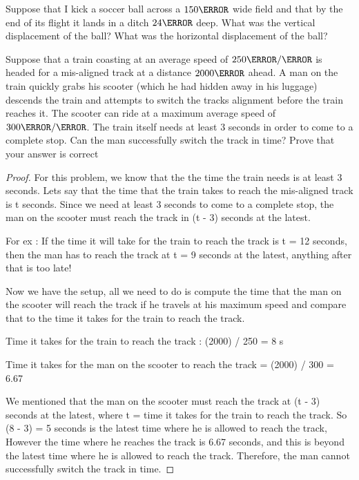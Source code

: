 \documentclass[12pt]{article} %
\begin{document}
\begin{qstn}[11]
Suppose that I kick a soccer ball across a $150\m$ wide field and that by the end of its flight it lands in a ditch $24\m$ deep. What was the vertical displacement of the ball? What was the horizontal displacement of the ball? 

\end{qstn}

\begin{qstn}[12]
Suppose that a train coasting at an average speed of $250 \m / \s$ is headed for a mis-aligned track at a distance $2000\m$ ahead. A man on the train quickly grabs his scooter (which he had hidden away in his luggage) descends the train and attempts to switch the tracks alignment before the train reaches it. The scooter can ride at a maximum average speed of $300 \m / \s$. The train itself needs at least $3$ seconds in order to come to a complete stop. Can the man successfully switch the track in time? Prove that your answer is correct

\begin{soln}
\begin{proof}
	For this problem, we know that the the time the train needs is at least 3 seconds. Lets say that the time that the train takes to reach the mis-aligned track is t seconds. Since we need at least 3 seconds to come to a complete stop, the man on the scooter must reach the track in (t - 3) seconds at the latest.

	For ex : If the time it will take for the train to reach the track is t = 12 seconds, then the man has to reach the track at t = 9 seconds at the latest, anything after that is too late!
	
	Now we have the setup, all we need to do is compute the time that the man on the scooter will reach the track if he travels at his maximum speed and compare that to the time it takes for the train to reach the track.
	
	Time it takes for the train to reach the track : (2000) / 250 = 8 s
	
	Time it takes for the man on the scooter to reach the track 
	  = (2000) / 300 = 6.67
	
	We mentioned that the man on the scooter must reach the track at (t - 3) seconds at the latest, where t = time it takes for the train to reach the track. So (8 - 3) = 5 seconds is the latest time where he is allowed to reach the track, However the time where he reaches the track is 6.67 seconds, and this is beyond the latest time where he is allowed to reach the track. Therefore, the man cannot successfully switch the track in time. 

\end{proof}

\end{soln}

\end{qstn}
\end{document}

